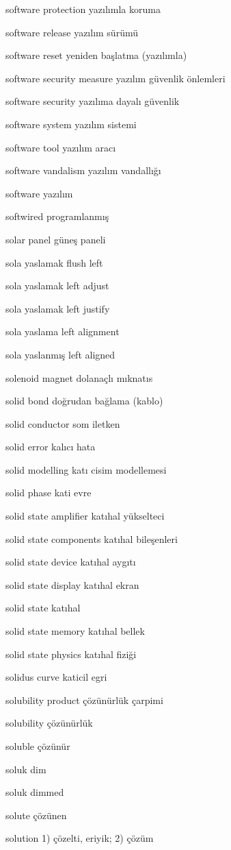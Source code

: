 \documentclass[12pt,fleqn]{article}\usepackage{../../common}
\begin{document}
software protection yazılımla koruma

software release yazılım sürümü

software reset yeniden başlatma (yazılımla)

software security measure yazılım güvenlik önlemleri

software security yazılıma dayalı güvenlik

software system yazılım sistemi

software tool yazılım aracı

software vandalism yazılım vandallığı

software yazılım

softwired programlanmış

solar panel güneş paneli

sola yaslamak flush left

sola yaslamak left adjust

sola yaslamak left justify

sola yaslama left alignment

sola yaslanmış left aligned

solenoid magnet dolanaçlı mıknatıs

solid bond doğrudan bağlama (kablo)

solid conductor som iletken

solid error kalıcı hata

solid modelling katı cisim modellemesi

solid phase kati evre

solid state amplifier katıhal yükselteci

solid state components katıhal bileşenleri

solid state device katıhal aygıtı

solid state display katıhal ekran

solid state katıhal

solid state memory katıhal bellek

solid state physics katıhal fiziği

solidus curve katicil egri

solubility product çözünürlük çarpimi

solubility çözünürlük

soluble çözünür

soluk dim

soluk dimmed

solute çözünen

solution 1) çözelti, eriyik; 2) çözüm
\end{document}

